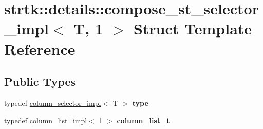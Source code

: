 \hypertarget{structstrtk_1_1details_1_1compose__st__selector__impl_3_01T_00_011_01_4}{\section{strtk\-:\-:details\-:\-:compose\-\_\-st\-\_\-selector\-\_\-impl$<$ T, 1 $>$ Struct Template Reference}
\label{structstrtk_1_1details_1_1compose__st__selector__impl_3_01T_00_011_01_4}
}
\subsection*{Public Types}
\begin{DoxyCompactItemize}
\item 
\hypertarget{structstrtk_1_1details_1_1compose__st__selector__impl_3_01T_00_011_01_4_a414d215d97bd5f6371837df1304f13f1}{typedef \hyperlink{classstrtk_1_1details_1_1column__selector__impl}{column\-\_\-selector\-\_\-impl}$<$ T $>$ {\bfseries type}}\label{structstrtk_1_1details_1_1compose__st__selector__impl_3_01T_00_011_01_4_a414d215d97bd5f6371837df1304f13f1}

\item 
\hypertarget{structstrtk_1_1details_1_1compose__st__selector__impl_3_01T_00_011_01_4_a5f4f3a4e229ac8766bb97426e813fd37}{typedef \hyperlink{structstrtk_1_1details_1_1column__list__impl}{column\-\_\-list\-\_\-impl}$<$ 1 $>$ {\bfseries column\-\_\-list\-\_\-t}}\label{structstrtk_1_1details_1_1compose__st__selector__impl_3_01T_00_011_01_4_a5f4f3a4e229ac8766bb97426e813fd37}

\end{DoxyCompactItemize}
